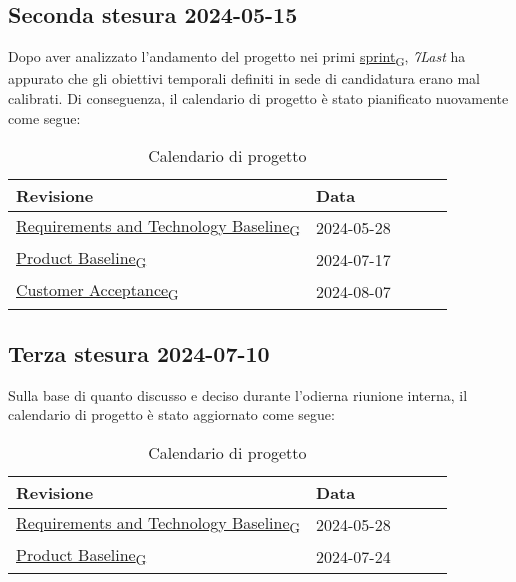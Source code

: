 \subsection{Seconda stesura 2024-05-15}
Dopo aver analizzato l'andamento del progetto nei primi \href{https://7last.github.io/docs/pb/documentazione-interna/glossario\#sprint}{sprint\textsubscript{G}}, \textit{7Last} ha appurato che gli obiettivi temporali definiti in sede di candidatura erano mal calibrati. Di conseguenza, il calendario di progetto è stato pianificato nuovamente come segue:
\begin{table}[!h]
    \begin{center}
        \begin{tabular}{ | l | l | l | l | l | }
            \hline
            Revisione                               & Data       \\ \hline
            \href{https://7last.github.io/docs/pb/documentazione-interna/glossario\#requirements-and-technology-baseline}{Requirements and Technology Baseline\textsubscript{G}}    & 2024-05-28 \\
            \href{https://7last.github.io/docs/pb/documentazione-interna/glossario\#product-baseline}{Product Baseline\textsubscript{G}}                        & 2024-07-17 \\
            \href{https://7last.github.io/docs/pb/documentazione-interna/glossario\#customer-acceptance}{Customer Acceptance\textsubscript{G}}                     & 2024-08-07 \\
            \hline
        \end{tabular}
    \end{center}
    \caption{Calendario di progetto}
\end{table}

\subsection{Terza stesura 2024-07-10}
Sulla base di quanto discusso e deciso durante l'odierna riunione interna, il calendario di progetto è stato aggiornato come segue:
\begin{table}[!h]
    \begin{center}
        \begin{tabular}{ | l | l | l | l | l | }
            \hline
            Revisione                               & Data       \\ \hline
            \href{https://7last.github.io/docs/pb/documentazione-interna/glossario\#requirements-and-technology-baseline}{Requirements and Technology Baseline\textsubscript{G}}    & 2024-05-28 \\
            \href{https://7last.github.io/docs/pb/documentazione-interna/glossario\#product-baseline}{Product Baseline\textsubscript{G}}    & 2024-07-24\\
            \hline
        \end{tabular}
    \end{center}
    \caption{Calendario di progetto}
\end{table}